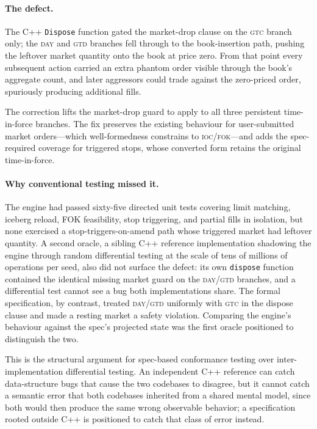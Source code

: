 \documentclass[11pt,a4paper]{article}
\begin{document}
\paragraph{The defect.} The C++ \texttt{Dispose} function gated
the market-drop clause on the \textsc{gtc} branch only; the
\textsc{day} and \textsc{gtd} branches fell through to the
book-insertion path, pushing the leftover market quantity onto
the book at price zero. From that point every subsequent action
carried an extra phantom order visible through the book's
aggregate count, and later aggressors could trade against the
zero-priced order, spuriously producing additional fills.

The correction lifts the market-drop guard to apply to all three
persistent time-in-force branches. The fix preserves the existing
behaviour for user-submitted market orders---which well-formedness
constrains to \textsc{ioc}/\textsc{fok}---and adds the
spec-required coverage for triggered stops, whose converted form
retains the original time-in-force.

\paragraph{Why conventional testing missed it.} The engine had
passed sixty-five directed unit tests covering limit matching,
iceberg reload, FOK feasibility, stop triggering, and partial
fills in isolation, but none exercised a stop-triggers-on-amend
path whose triggered market had leftover quantity. A second
oracle, a sibling C++ reference implementation shadowing the
engine through random differential testing at the scale of tens
of millions of operations per seed, also did not surface the
defect: its own \texttt{dispose} function contained the identical
missing market guard on the \textsc{day}/\textsc{gtd} branches,
and a differential test cannot see a bug both implementations
share. The formal specification, by contrast, treated
\textsc{day}/\textsc{gtd} uniformly with \textsc{gtc} in the
dispose clause and made a resting market a safety violation.
Comparing the engine's behaviour against the spec's projected
state was the first oracle positioned to distinguish the two.

This is the structural argument for spec-based conformance
testing over inter-implementation differential testing. An
independent C++ reference can catch data-structure bugs that
cause the two codebases to disagree, but it cannot catch a semantic
error that both codebases inherited from a shared mental
model, since both would then produce the same wrong observable
behavior; a specification rooted outside C++ is positioned to catch
that class of error instead.
\end{document}
